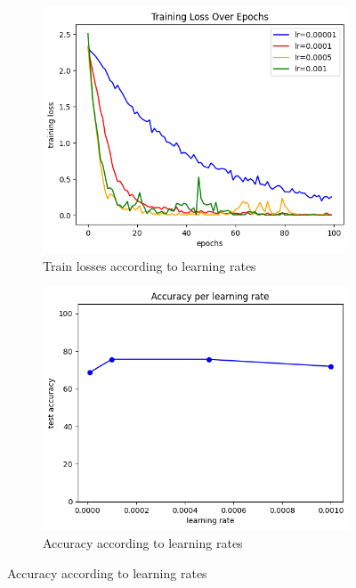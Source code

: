 \begin{figure}[htbp]
	\centering
	\begin{subfigure}{0.48\linewidth}
		\centering
		\includegraphics[width=\linewidth]{image/q4-7-lr-train.png}
		\caption{Train losses according to learning rates}
		\label{fig:q4-7-lr-train}
	\end{subfigure}%
	\hfill
	\begin{subfigure}{0.48\linewidth}
		\centering
		\includegraphics[width=\linewidth]{image/q4-7-lr.png}
		\caption{Accuracy according to learning rates}
		\label{fig:q4-7-lr}
	\end{subfigure}
	

\end{figure}
